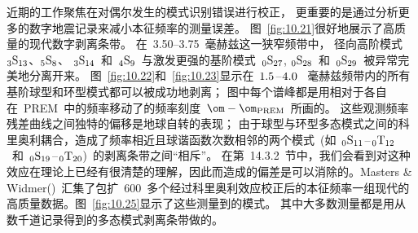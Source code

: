 近期的工作聚焦在对偶尔发生的模式识别错误进行校正，
更重要的是通过分析更多的数字地震记录来减小本征频率的测量误差。
图~\ref{fig:10.21}很好地展示了高质量的现代数字剥离条带。
在~3.50--3.75~毫赫兹这一狭窄频带中，
径向高阶模式~${}_3{\rm S}_{13}$、${}_5{\rm S}_{8}$、
${}_3{\rm S}_{14}$~和~${}_4{\rm S}_9$~与激发更强的基阶模式~${}_0{\rm S}_{27}$, ${}_0{\rm S}_{28}$~和~${}_0{\rm S}_{29}$~被异常完美地分离开来。
图~\ref{fig:10.22}和~\ref{fig:10.23}显示在~$1.5\hspace{0.2 mm}$--$\hspace{0.2 mm}4.0$ ~毫赫兹频带内的所有基阶球型和环型模式都可以被成功地剥离；
图中每个谱峰都是用相对于各自在~PREM~中的频率移动了的频率刻度~$\om-\om_{\rm PREM}$~所画的。
这些观测频率残差曲线之间独特的偏移是地球自转的表现；
由于球型与环型多态模式之间的科里奥利耦合，造成了频率相近且球谐函数次数相邻的两个模式~(如~${}_0{\rm S}_{11}\hspace{0.2 mm}$--$\hspace{0.2 mm}
{}_0{\rm T}_{12}$~和~${}_0{\rm S}_{19}\hspace{0.2 mm}$--$\hspace{0.2 mm}
{}_0{\rm T}_{20}$)~的剥离条带之间“相斥”。
%
在第~14.3.2~节中，我们会看到对这种效应在理论上已经有很清楚的理解，因此而造成的偏差是可以消除的。Masters \& Widmer(\citeyear{masters&widmer95})~汇集了包扩~600~多个经过科里奥利效应校正后的本征频率一组现代的高质量数据。图~\ref{fig:10.25}显示了这些测量到的模式。
其中大多数测量都是用从数千道记录得到的多态模式剥离条带做的。
%
%

